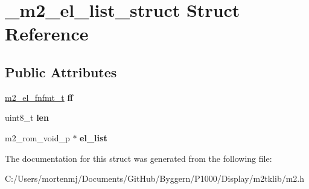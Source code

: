 \hypertarget{struct__m2__el__list__struct}{\section{\-\_\-m2\-\_\-el\-\_\-list\-\_\-struct Struct Reference}
\label{struct__m2__el__list__struct}
}
\subsection*{Public Attributes}
\begin{DoxyCompactItemize}
\item 
\hypertarget{struct__m2__el__list__struct_aca327150e6bdd1a5524c79531f56cb81}{\hyperlink{struct__m2__el__fnfmt__struct}{m2\-\_\-el\-\_\-fnfmt\-\_\-t} {\bfseries ff}}\label{struct__m2__el__list__struct_aca327150e6bdd1a5524c79531f56cb81}

\item 
\hypertarget{struct__m2__el__list__struct_aadb3db7aa1b595279996c57f3a047cfe}{uint8\-\_\-t {\bfseries len}}\label{struct__m2__el__list__struct_aadb3db7aa1b595279996c57f3a047cfe}

\item 
\hypertarget{struct__m2__el__list__struct_adc454d0583aaf49a77691e1a93b8ba2e}{m2\-\_\-rom\-\_\-void\-\_\-p $\ast$ {\bfseries el\-\_\-list}}\label{struct__m2__el__list__struct_adc454d0583aaf49a77691e1a93b8ba2e}

\end{DoxyCompactItemize}


The documentation for this struct was generated from the following file\-:\begin{DoxyCompactItemize}
\item 
C\-:/\-Users/mortenmj/\-Documents/\-Git\-Hub/\-Byggern/\-P1000/\-Display/m2tklib/m2.\-h\end{DoxyCompactItemize}
